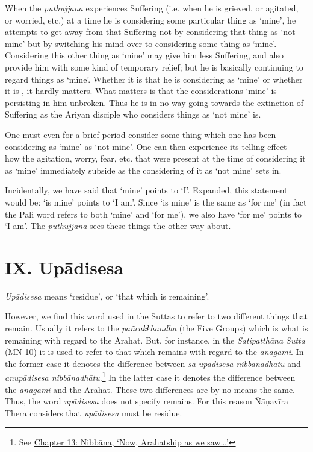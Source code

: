 When the \emph{puthujjana} experiences Suffering (i.e. when he is grieved, or agitated, or worried, etc.) at a time he is considering some particular thing as `mine', he attempts to get away from that Suffering not by considering that  thing as `not mine' but by switching his mind over to considering some  thing as `mine'. Considering this other thing as `mine' may give him less Suffering, and also provide him with some kind of temporary relief; but he is basically continuing to regard things as `mine'. Whether it is  that he is considering as `mine' or whether it is , it hardly matters. What matters is that the considerations `mine' is persisting in him unbroken. Thus he is in no way going towards the extinction of Suffering as the Ariyan disciple who considers things as `not mine' is.

One must even for a brief period consider some thing which one has been considering as `mine' as `not mine'. One can then experience its telling effect -- how the agitation, worry, fear, etc. that were present at the time of considering it as `mine' immediately subside as the considering of it as `not mine' sets in.

Incidentally, we have said that `mine' points to `I'. Expanded, this statement would be: `is mine' points to `I am'. Since `is mine' is the same as `for me' (in fact the Pali word  refers to both `mine' and `for me'), we also have `for me' points to `I am'. The \emph{puthujjana} sees these things the other way about.

\hypertarget{_ix_upux101disesa}{%
\section{IX. Upādisesa}\label{_ix_upux101disesa}}

\emph{Upādisesa} means `residue', or `that which is remaining'.

However, we find this word used in the Suttas to refer to two different things that remain. Usually it refers to the \emph{pañcakkhandha} (the Five Groups) which is what is remaining with regard to the Arahat. But, for instance, in the \emph{Satipatthāna Sutta} (\href{https://suttacentral.net/mn10/en/sujato}{MN 10}) it is used to refer to that which remains with regard to the \emph{anāgāmi}. In the former case it denotes the difference between \emph{sa-upādisesa nibbānadhātu} and \emph{anupādisesa nibbānadhātu}.\footnote{See \href{ch-13-nibbana.xml\#remainder}{Chapter 13: Nibbāna, `Now, Arahatship as we saw\ldots\hspace{0pt}'}} In the latter case it denotes the difference between the \emph{anāgāmi} and the Arahat. These two differences are by no means the same. Thus, the word \emph{upādisesa} does not specify  remains. For this reason Ñāṇavīra Thera considers that \emph{upādisesa} must be  residue.

